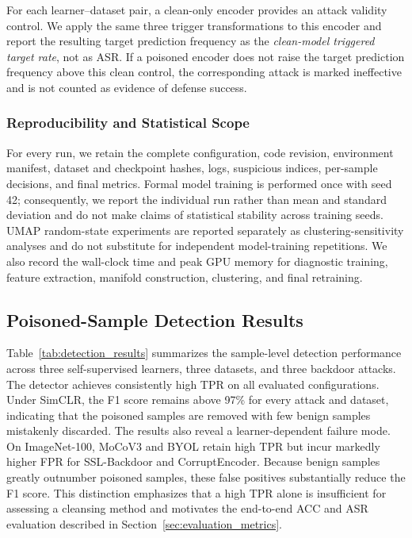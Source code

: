 \documentclass[10pt,journal]{IEEEtran}
\begin{document}
For each learner--dataset pair, a clean-only encoder provides an attack
validity control. We apply the same three trigger transformations to this
encoder and report the resulting target prediction frequency as the
\emph{clean-model triggered target rate}, not as ASR. If a poisoned
encoder does not raise the target prediction frequency above this clean
control, the corresponding attack is marked ineffective and is not counted
as evidence of defense success.

\subsubsection{Reproducibility and Statistical Scope}
For every run, we retain the complete configuration, code revision,
environment manifest, dataset and checkpoint hashes, logs, suspicious
indices, per-sample decisions, and final metrics. Formal model training is
performed once with seed 42; consequently, we report the individual run
rather than mean and standard deviation and do not make claims of
statistical stability across training seeds. UMAP random-state experiments
are reported separately as clustering-sensitivity analyses and do not
substitute for independent model-training repetitions. We also record the
wall-clock time and peak GPU memory for diagnostic training, feature
extraction, manifold construction, clustering, and final retraining.

\subsection{Poisoned-Sample Detection Results}
\label{sec:detection_results}

Table~\ref{tab:detection_results} summarizes the sample-level detection
performance across three self-supervised learners, three datasets, and three
backdoor attacks. The detector achieves consistently high TPR on all evaluated
configurations. Under SimCLR, the F1 score remains above 97\% for every attack
and dataset, indicating that the poisoned samples are removed with few benign
samples mistakenly discarded. The results also reveal a learner-dependent
failure mode. On ImageNet-100, MoCoV3 and BYOL retain high TPR but incur markedly
higher FPR for SSL-Backdoor and CorruptEncoder. Because benign samples greatly
outnumber poisoned samples, these false positives substantially reduce the F1
score. This distinction emphasizes that a high TPR alone is insufficient for
assessing a cleansing method and motivates the end-to-end ACC and ASR evaluation
described in Section~\ref{sec:evaluation_metrics}.
\end{document}

